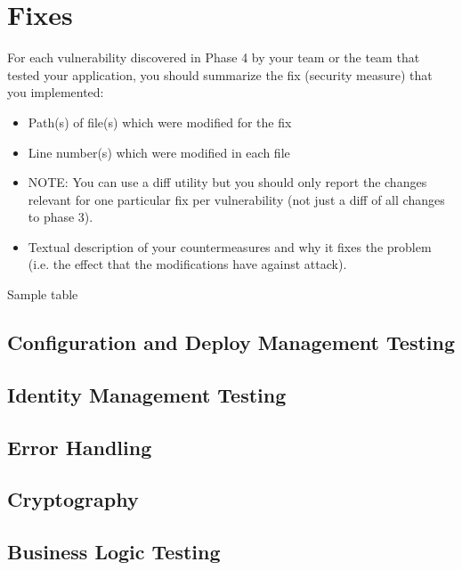 \chapter{Fixes}\label{chapter:fixes}

For each vulnerability discovered in Phase 4 by your team or the team that tested your
application, you should summarize the fix (security measure) that you implemented:
\begin{itemize}
	\item Path(s) of file(s) which were modified for the fix
	\item Line number(s) which were modified in each file 
	\item NOTE: You can use a diff utility but you should only report the changes relevant for one particular fix per vulnerability (not just a diff of all changes to phase 3).
	\item Textual description of your countermeasures and why it fixes the problem (i.e. the effect that the modifications have against attack).
\end{itemize}

Sample table
\fixtable{%
}{%
}{%
}{%
}{%
}

\section{Configuration and Deploy Management Testing}

\clearpage
\section{Identity Management Testing}

\clearpage
\section{Error Handling}

\clearpage
\section{Cryptography}

\clearpage
\section{Business Logic Testing}

